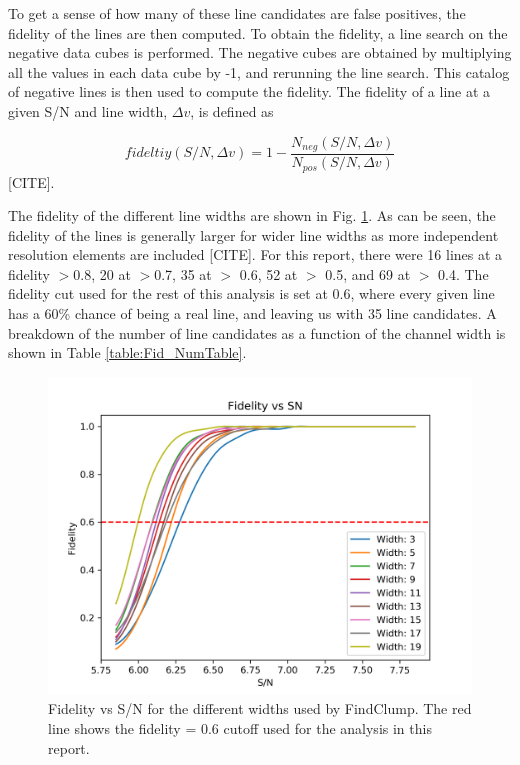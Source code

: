 To get a sense of how many of these line candidates are false positives, the fidelity of the lines are then computed. To obtain the fidelity, a line search on the negative data cubes is performed. The negative cubes are obtained by multiplying all the values in each data cube by -1, and rerunning the line search. This catalog of negative lines is then used to compute the fidelity. The fidelity of a line at a given S/N and line width, $\Delta v$, is defined as 

$$ fideltiy(S/N, \Delta v) = 1 - \frac{N_{neg}(S/N, \Delta v)}{N_{pos}(S/N, \Delta v)} $$ [CITE].

The fidelity of the different line widths are shown in Fig. \ref{fig:Fid_map}. As can be seen, the fidelity of the lines is generally larger for wider line widths as more independent resolution elements are included [CITE]. For this report, there were 16 lines at a fidelity $>$0.8, 20 at $>$0.7, 35 at $>$ 0.6, 52 at $>$ 0.5, and 69 at $>$ 0.4. The fidelity cut used for the rest of this analysis is set at 0.6, where every given line has a 60\% chance of being a real line, and leaving us with 35 line candidates. A breakdown of the number of line candidates as a function of the channel width is shown in Table \ref{table:Fid_NumTable}. 

\begin{figure}[tbp]
\centering \includegraphics[width=120mm]{Fidelity_map.png}
\caption{Fidelity vs S/N for the different widths used by FindClump. The red line shows the fidelity = 0.6 cutoff used for the analysis in this report.}
\label{fig:Fid_map}
\end{figure}

